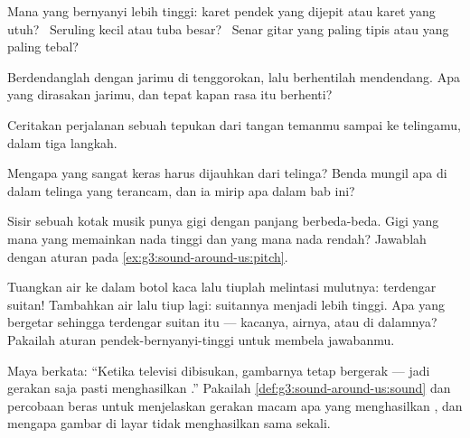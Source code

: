 \begin{exercise}[$\star$]\label{exo:g3:sound-around-us:5}
Mana yang bernyanyi lebih tinggi: karet pendek yang dijepit atau karet
yang utuh? \ Seruling kecil atau tuba besar? \ Senar gitar yang paling
tipis atau yang paling tebal?
\end{exercise}

\begin{exercise}[$\star$]\label{exo:g3:sound-around-us:6}
Berdendanglah dengan jarimu di tenggorokan, lalu berhentilah
mendendang. Apa yang dirasakan jarimu, dan tepat kapan rasa itu
berhenti?
\end{exercise}

\begin{exercise}[$\star$]\label{exo:g3:sound-around-us:7}
Ceritakan perjalanan sebuah tepukan dari tangan temanmu sampai ke
telingamu, dalam tiga langkah.
\end{exercise}

\begin{exercise}[$\star$]\label{exo:g3:sound-around-us:8}
Mengapa  yang sangat keras harus dijauhkan dari telinga? Benda
mungil apa di dalam telinga yang terancam, dan ia mirip apa dalam bab
ini?
\end{exercise}

\begin{exercise}[$\star$]\label{exo:g3:sound-around-us:9}
Sisir sebuah kotak musik punya gigi dengan panjang berbeda-beda. Gigi
yang mana yang memainkan nada tinggi dan yang mana nada rendah?
Jawablah dengan aturan pada \cref{ex:g3:sound-around-us:pitch}.
\end{exercise}

\begin{exercise}[$\star\star$]\label{exo:g3:sound-around-us:10}
Tuangkan air ke dalam botol kaca lalu tiuplah melintasi mulutnya:
terdengar suitan! Tambahkan air lalu tiup lagi: suitannya menjadi
lebih tinggi. Apa yang bergetar sehingga terdengar suitan itu ---
kacanya, airnya, atau  di dalamnya? Pakailah aturan
pendek-bernyanyi-tinggi untuk membela jawabanmu.
\end{exercise}

\begin{exercise}[$\star\star$]\label{exo:g3:sound-around-us:11}
Maya berkata: ``Ketika televisi dibisukan, gambarnya tetap bergerak
--- jadi gerakan saja pasti menghasilkan .'' Pakailah
\cref{def:g3:sound-around-us:sound} dan percobaan beras untuk
menjelaskan gerakan macam apa yang menghasilkan , dan mengapa
gambar di layar tidak menghasilkan  sama sekali.
\end{exercise}
